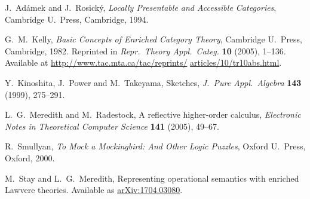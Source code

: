 \documentclass{amsart}
\theoremstyle{definition}
\begin{document}
\begin{thebibliography}{100}

 J.\ Ad\'{a}mek and J.\ Rosick\'{y}, \textsl{Locally Presentable and Accessible Categories}, Cambridge U.\ Press, Cambridge, 1994.


 G.\ M.\ Kelly, \textsl{Basic Concepts of Enriched Category Theory},
Cambridge U.\ Press, Cambridge, 1982.   Reprinted in \textsl{Repr.\ Theory Appl.\ Categ.} \textbf{10} (2005), 1--136.  Available at \href{http://www.tac.mta.ca/tac/reprints/articles/10/tr10abs.html}{http://www.tac.mta.ca/tac/reprints/} \break \href{http://www.tac.mta.ca/tac/reprints/articles/10/tr10abs.html}{articles/10/tr10abs.html}.

 Y.\ Kinoshita, J.\ Power and M.\ Takeyama, Sketches,
\textsl{J.\ Pure Appl.\ Algebra} \textbf{143} (1999), 275--291.

 L.\ G.\ Meredith and M.\ Radestock, A reflective higher-order calculus,
\textsl{Electronic Notes in Theoretical Computer Science} \textbf{141} (2005), 49--67.
	
 R.\ Smullyan, \textsl{To Mock a Mockingbird: And Other Logic Puzzles},
Oxford U.\ Press, Oxford, 2000.
	
 M.\ Stay and L.\ G.\ Meredith, Representing operational semantics 
with enriched Lawvere theories.  Available as
\href{https://arxiv.org/abs/1704.03080}{arXiv:1704.03080}.



\end{thebibliography}
\end{document}
